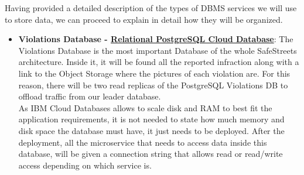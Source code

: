 Having provided a detailed description of the types of DBMS services we will use to store data, we can proceed to explain in detail how they will be organized.
\begin{itemize}
	\item \textbf{Violations Database - \href{https://cloud.ibm.com/catalog/services/databases-for-postgresql}{Relational PostgreSQL Cloud Database}}: The Violations Database is the most important Database of the whole SafeStreets architecture. Inside it, it will be found all the reported infraction along with a link to the Object Storage where the pictures of each violation are. For this reason, there will be two read replicas of the PostgreSQL Violations DB to offload traffic from our leader database. 
	\\As IBM Cloud Databases allows to scale disk and RAM to best fit the application requirements, it is not needed to state how much memory and disk space the database must have, it just needs to be deployed. After the deployment, all the microservice that needs to access data inside this database, will be given a connection string that allows read or read/write access depending on which service is.
	\begin{comment}
	\begin{figure}[h!]
		\makebox[\textwidth]{\texttt{[image: /images/microservices/postgres.png]}}
		\caption{Scalable SafeStreets architecture to handle millions of users.}
	\end{figure}
	\FloatBarrier
	\end{comment}
	

\end{itemize}
